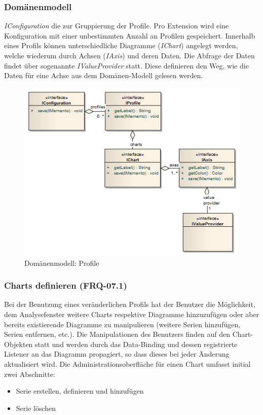 \subsubsection{Domänenmodell}
\textit{IConfiguration} die zur Gruppierung der Profile. Pro Extension wird eine Konfiguration mit einer unbestimmten Anzahl an Profilen gespeichert. Innerhalb eines Profils können unterschiedliche Diagramme (\textit{IChart}) angelegt werden, welche wiederum durch Achsen (\textit{IAxis}) und deren Daten. Die Abfrage der Daten findet über sogenannte \textit{IValueProvider} statt. Diese definieren den Weg, wie die Daten für eine Achse aus dem Domänen-Modell gelesen werden.
 \begin{figure}[H]
  	\centering
    	\includegraphics[width=12cm]{images/core_domain_profiles}
        	\caption{Domänenmodell: Profile}
\end{figure}

\subsubsection{Charts definieren (FRQ-07.1)}
Bei der Benutzung eines veränderlichen Profils hat der Benutzer die Möglichkeit, dem Analysefenster weitere Charts respektive Diagramme hinzuzufügen oder aber bereits existierende Diagramme zu manipulieren (weitere Serien hinzufügen, Serien entfernen, etc.). Die Manipulationen des Benutzers finden auf den Chart-Objekten statt und werden durch das Data-Binding und dessen registrierte Listener an das Diagramm propagiert, so dass dieses bei jeder Änderung aktualisiert wird. Die Administrationsoberfläche für einen Chart umfasst initial zwei Abschnitte:
\begin{itemize}
	\item Serie erstellen, definieren und hinzufügen
	 \item Serie löschen
\end{itemize}

